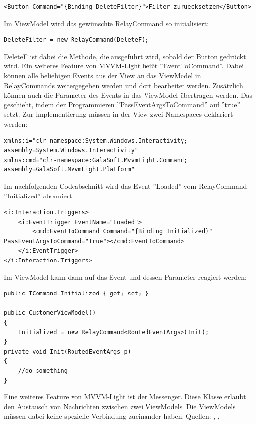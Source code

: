 \begin{lstlisting}
<Button Command="{Binding DeleteFilter}">Filter zuruecksetzen</Button>
\end{lstlisting}
\newpage \noindent Im ViewModel wird das gewünschte RelayCommand so initialisiert:
\begin{lstlisting}
DeleteFilter = new RelayCommand(DeleteF);
\end{lstlisting}
DeleteF ist dabei die Methode, die ausgeführt wird, sobald der Button gedrückt wird. \newline Ein weiteres Feature von MVVM-Light heißt ''EventToCommand''. Dabei können alle beliebigen Events aus der View an das ViewModel in RelayCommands weitergegeben werden und dort bearbeitet werden. Zusätzlich können auch die Parameter des Events in das ViewModel übertragen werden. Das geschieht, indem der Programmieren ''PassEventArgsToCommand'' auf ''true'' setzt. Zur Implementierung müssen in der View zwei Namespaces deklariert werden:
\begin{lstlisting}
xmlns:i="clr-namespace:System.Windows.Interactivity;
assembly=System.Windows.Interactivity"
xmlns:cmd="clr-namespace:GalaSoft.MvvmLight.Command;
assembly=GalaSoft.MvvmLight.Platform"
\end{lstlisting}
Im nachfolgenden Codeabschnitt wird das Event ''Loaded'' vom RelayCommand ''Initialized'' abonniert.
\begin{lstlisting}
<i:Interaction.Triggers>
	<i:EventTrigger EventName="Loaded">
		<cmd:EventToCommand Command="{Binding Initialized}" PassEventArgsToCommand="True"></cmd:EventToCommand>
	</i:EventTrigger>
</i:Interaction.Triggers>
\end{lstlisting}
Im ViewModel kann dann auf das Event und dessen Parameter reagiert werden:
\begin{lstlisting}
public ICommand Initialized { get; set; }

public CustomerViewModel()
{
	Initialized = new RelayCommand<RoutedEventArgs>(Init);
}
private void Init(RoutedEventArgs p)
{
	//do something
}
\end{lstlisting}
Eine weiteres Feature von MVVM-Light ist der Messenger. Diese Klasse erlaubt den Austausch von Nachrichten zwischen zwei ViewModels. Die ViewModels müssen dabei keine spezielle Verbindung zueinander haben.
\newline Quellen: \cite{dotnetcurry_using_2018}, \cite{dotnetpattern_mvvm_2018}, \cite{microsoft_mvvm_2018}


